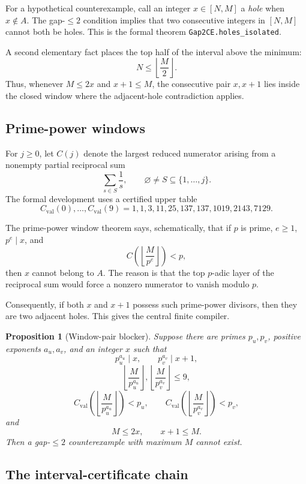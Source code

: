 \documentclass[11pt]{article}
\newtheorem{proposition}[theorem]{Proposition}
\theoremstyle{definition}
\newcommand{\1}{\mathbf 1}
\begin{document}
For a hypothetical counterexample, call an integer $x\in[N,M]$ a \emph{hole} when
$x\notin A$.  The gap-$\le2$ condition implies that two consecutive integers in
$[N,M]$ cannot both be holes.  This is the formal theorem
\texttt{Gap2CE.holes\_isolated}.

A second elementary fact places the top half of the interval above the minimum:
\[
N\le\left\lfloor\frac M2\right\rfloor.
\]
Thus, whenever $M\le2x$ and $x+1\le M$, the consecutive pair $x,x+1$ lies inside the
closed window where the adjacent-hole contradiction applies.

\subsection{Prime-power windows}

For $j\ge0$, let $C(j)$ denote the largest reduced numerator arising from a nonempty
partial reciprocal sum
\[
\sum_{s\in S}\frac1s,\qquad \varnothing\ne S\subseteq\{1,\dots,j\}.
\]
The formal development uses a certified upper table
\[
C_{\mathrm{val}}(0),\dots,C_{\mathrm{val}}(9)
=1,1,3,11,25,137,137,1019,2143,7129.
\]

The prime-power window theorem says, schematically, that if $p$ is prime, $e\ge1$,
$p^e\mid x$, and
\[
C\!\left(\left\lfloor\frac M{p^e}\right\rfloor\right)<p,
\]
then $x$ cannot belong to $A$.  The reason is that the top $p$-adic layer of the reciprocal
sum would force a nonzero numerator to vanish modulo $p$.

Consequently, if both $x$ and $x+1$ possess such prime-power divisors, then they are two
adjacent holes.  This gives the central finite compiler.

\begin{proposition}[Window-pair blocker]
Suppose there are primes $p_u,p_v$, positive exponents $a_u,a_v$, and an integer $x$ such
that
\[
p_u^{a_u}\mid x,\qquad p_v^{a_v}\mid x+1,
\]
\[
\left\lfloor\frac M{p_u^{a_u}}\right\rfloor,
\left\lfloor\frac M{p_v^{a_v}}\right\rfloor\le9,
\]
\[
C_{\mathrm{val}}\!\left(\left\lfloor\frac M{p_u^{a_u}}\right\rfloor\right)<p_u,
\qquad
C_{\mathrm{val}}\!\left(\left\lfloor\frac M{p_v^{a_v}}\right\rfloor\right)<p_v,
\]
and
\[
M\le2x,
\qquad x+1\le M.
\]
Then a gap-$\le2$ counterexample with maximum $M$ cannot exist.
\end{proposition}

\subsection{The interval-certificate chain}
\end{document}
